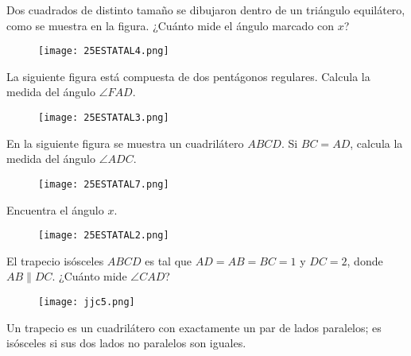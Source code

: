 \begin{problem}
    Dos cuadrados de distinto tamaño se dibujaron dentro de un 
    triángulo equilátero, como se muestra en la figura. ¿Cuánto 
    mide el ángulo marcado con $x$?
\end{problem}

\begin{figure}[h!]
    \centering
    \texttt{[image: 25ESTATAL4.png]}
\end{figure}

\begin{problem}
    La siguiente figura está compuesta de dos pentágonos 
    regulares. Calcula la medida del ángulo $\angle FAD$.
\end{problem}

\begin{figure}[h!]
    \centering
    \texttt{[image: 25ESTATAL3.png]}
\end{figure}

\begin{problem}
    En la siguiente figura se muestra un cuadrilátero $ABCD$. 
    Si $BC=AD$, calcula la medida del ángulo $\angle ADC$.
\end{problem}

\begin{figure}[!h]
    \centering
    \texttt{[image: 25ESTATAL7.png]}
\end{figure}

\begin{dproblem}
    Encuentra el ángulo $x$.    
\end{dproblem}

\begin{figure}[!h]
    \centering
    \texttt{[image: 25ESTATAL2.png]}
\end{figure}

\begin{problem}[$5 \clubsuit$]
    El trapecio isósceles $ABCD$ es tal que $AD = AB = BC = 1$ y 
    $DC = 2$, donde $AB \parallel DC$. ¿Cuánto mide $\angle CAD$?
\end{problem}

\begin{figure}[!h]
    \centering
    \texttt{[image: jjc5.png]}
\end{figure}

\begin{remark}
    Un trapecio es un cuadrilátero con exactamente un par de 
    lados paralelos; es isósceles si sus dos lados no paralelos 
    son iguales.
\end{remark}

